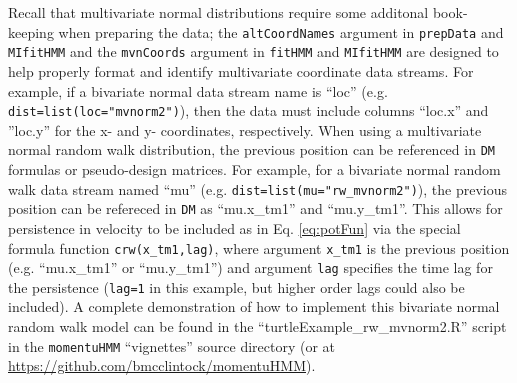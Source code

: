 \documentclass[12pt]{article}\usepackage[]{graphicx}\usepackage[]{xcolor}
\begin{document}
Recall that multivariate normal distributions require some additonal book-keeping when preparing the data; the \verb|altCoordNames| argument in \verb|prepData| and \verb|MIfitHMM| and the \verb|mvnCoords| argument in \verb|fitHMM| and \verb|MIfitHMM| are designed to help properly format and identify multivariate coordinate data streams. For example, if a bivariate normal data stream name is ``loc'' (e.g. \verb|dist=list(loc="mvnorm2")|), then the data must include columns ``loc.x'' and ''loc.y'' for the x- and y- coordinates, respectively.  When using a multivariate normal random walk distribution, the previous position can be referenced in \verb|DM| formulas or pseudo-design matrices. For example, for a bivariate normal random walk data stream named ``mu'' (e.g. \verb|dist=list(mu="rw_mvnorm2")|), the previous position can be refereced in \verb|DM| as ``mu.x\_tm1'' and ``mu.y\_tm1''. This allows for persistence in velocity to be included as in Eq. \ref{eq:potFun} via the special formula function \verb|crw(x_tm1,lag)|, where argument \verb|x_tm1| is the previous position (e.g. ``mu.x\_tm1'' or ``mu.y\_tm1'') and argument \verb|lag| specifies the time lag for the persistence (\verb|lag=1| in this example, but higher order lags could also be included). A complete demonstration of how to implement this bivariate normal random walk model can be found in the ``turtleExample\_rw\_mvnorm2.R'' script in the \verb|momentuHMM| ``vignettes'' source directory (or at \url{https://github.com/bmcclintock/momentuHMM}).
\end{document}
